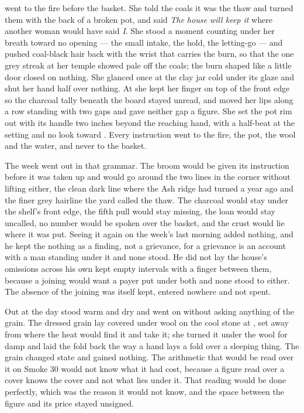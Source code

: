  went to the fire before the basket. She told the coals it was the thaw and turned them with the back of a broken pot, and said \emph{The house will keep it} where another woman would have said \emph{I}. She stood a moment counting under her breath toward no opening --- the small intake, the hold, the letting-go --- and pushed coal-black hair back with the wrist that carries the burn, so that the one grey streak at her temple showed pale off the coals; the burn shaped like a little door closed on nothing. She glanced once at the clay jar cold under its glaze and shut her hand half over nothing. At  she kept her finger on top of the front edge so the charcoal tally beneath the board stayed unread, and moved her lips along a row standing with two gaps and gave neither gap a figure. She set the pot rim out with its handle two inches beyond the reaching hand, with a half-beat at the setting and no look toward . Every instruction went to the fire, the pot, the wool and the water, and never to the basket.

The week went out in that grammar. The broom would be given its instruction before it was taken up and would go around the two lines in the corner without lifting either, the clean dark line where the Ash ridge had turned a year ago and the finer grey hairline the yard called the thaw. The charcoal would stay under the shelf's front edge, the fifth pull would stay missing, the loan would stay uncalled, no number would be spoken over the basket, and the crust would lie where it was put. Seeing it again on the week's last morning added nothing, and he kept the nothing as a finding, not a grievance, for a grievance is an account with a man standing under it and none stood. He did not lay the house's omissions across his own kept empty intervals with a finger between them, because a joining would want a payer put under both and none stood to either. The absence of the joining was itself kept, entered nowhere and not spent.

\scenebreak

Out at  the day stood warm and dry and went on without asking anything of the grain. The dressed grain lay covered under wool on the cool stone at , set away from  where the heat would find it and take it; she turned it under the wool for damp and laid the fold back the way a hand lays a fold over a sleeping thing. The grain changed state and gained nothing. The arithmetic that would be read over it on Smoke 30 would not know what it had cost, because a figure read over a cover knows the cover and not what lies under it. That reading would be done perfectly, which was the reason it would not know, and the space between the figure and its price stayed unsigned.

